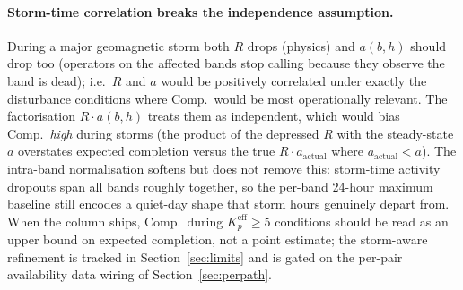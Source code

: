 \documentclass[11pt,a4paper]{article}
\begin{document}
\paragraph{Storm-time correlation breaks the independence
assumption.}  During a major geomagnetic storm both $R$ drops
(physics) and $a(b, h)$ should drop too (operators on the affected
bands stop calling because they observe the band is dead);
i.e.\ $R$ and $a$ would be positively correlated under exactly
the disturbance conditions where Comp.\ would be most
operationally relevant.  The factorisation $R \cdot a(b, h)$
treats them as independent, which would bias Comp.\ \emph{high}
during storms (the product of the depressed $R$ with the
steady-state $a$ overstates expected completion versus the true
$R \cdot a_{\text{actual}}$ where $a_{\text{actual}} < a$).  The
intra-band normalisation softens but does not remove this:
storm-time activity dropouts span all bands roughly together, so
the per-band 24-hour maximum baseline still encodes a quiet-day
shape that storm hours genuinely depart from.  When the column
ships, Comp.\ during $K_p^{\text{eff}} \geq 5$ conditions should
be read as an upper bound on expected completion, not a point
estimate; the storm-aware refinement is tracked in
Section~\ref{sec:limits} and is gated on the per-pair
availability data wiring of Section~\ref{sec:perpath}.
\end{document}
